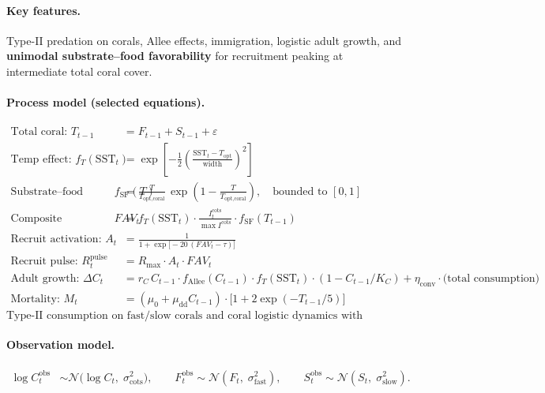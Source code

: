 \paragraph{Key features.}
Type-II predation on corals, Allee effects, immigration, logistic adult growth, and \textbf{unimodal substrate–food favorability} for recruitment peaking at intermediate total coral cover.

\paragraph{Process model (selected equations).}
\begin{align}
\text{Total coral: } T_{t-1} &= F_{t-1} + S_{t-1} + \varepsilon \\
\text{Temp effect: } f_T(\mathrm{SST}_t) &= \exp\!\left[-\tfrac12\left(\frac{\mathrm{SST}_t - T_{\text{opt}}}{\text{width}}\right)^2\right] \\[4pt]
\text{Substrate–food favorability: } f_{\text{SF}}(T) &= \frac{T}{T_{\text{opt,coral}}}\,\exp\!\left(1 - \frac{T}{T_{\text{opt,coral}}}\right), \quad \text{bounded to }[0,1] \\[4pt]
\text{Composite favorability: } FAV_t &= f_T(\mathrm{SST}_t)\cdot \frac{I^{\text{cots}}_t}{\max I^{\text{cots}}}\cdot f_{\text{SF}}(T_{t-1}) \\[4pt]
\text{Recruit activation: } A_t &= \frac{1}{1+\exp\big[-20\,(FAV_t - \tau)\big]} \\[4pt]
\text{Recruit pulse: } R^{\text{pulse}}_{t} &= R_{\max}\cdot A_t\cdot FAV_t \\[4pt]
\text{Adult growth: } \Delta C_t &= r_C\,C_{t-1}\cdot f_{\text{Allee}}(C_{t-1})\cdot f_T(\mathrm{SST}_t)\cdot (1 - C_{t-1}/K_C)
+ \eta_{\text{conv}}\cdot \text{(total consumption)} \\
\text{Mortality: } M_t &= (\mu_0 + \mu_{\text{dd}} C_{t-1})\cdot \big[1 + 2\exp(-T_{t-1}/5)\big]
\end{align}
\(\text{Type-II consumption on fast/slow corals and coral logistic dynamics with temperature stress are as in the implementation.}\)

\paragraph{Observation model.}
\begin{align}
\log C^{\text{obs}}_t &\sim \mathcal{N}\!\big(\log C_t,\; \sigma_{\text{cots}}^2\big),\qquad
F^{\text{obs}}_t \sim \mathcal{N}(F_t,\; \sigma_{\text{fast}}^2),\qquad
S^{\text{obs}}_t \sim \mathcal{N}(S_t,\; \sigma_{\text{slow}}^2).
\end{align}

